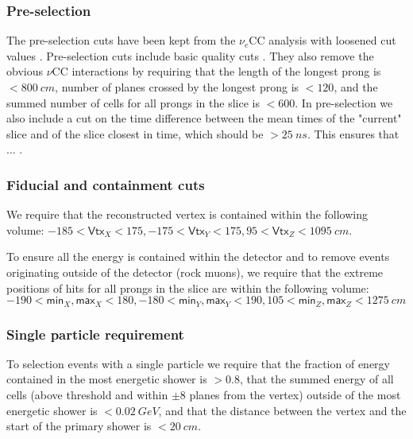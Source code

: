 \subsubsection*{Pre-selection}

The pre-selection cuts have been kept from the $\nu_e$CC analysis with loosened cut values .
Pre-selection cuts include basic quality cuts . They also remove the obvious $\nu$CC interactions by requiring that the length of the longest prong is $<800\ \unit{cm}$, number of planes crossed by the longest prong is $<120$, and the summed number of cells for all prongs in the slice is $<600$. In pre-selection we also include a cut on the time difference between the mean times of the "current" slice and of the slice closest in time, which should be $>25\ \unit{ns}$. This ensures that ... .


\subsubsection*{Fiducial and containment cuts}

We require that the reconstructed vertex is contained within the following volume: $-185<\textsf{Vtx}_X<175,-175<\textsf{Vtx}_Y<175, 95<\textsf{Vtx}_Z<1095\ \unit{cm}$.

To ensure all the energy is contained within the detector and to remove events originating outside of the detector (rock muons), we require that the extreme positions of hits for all prongs in the slice are within the following volume: $-190<\textsf{min}_X, \textsf{max}_X<180, -180<\textsf{min}_Y, \textsf{max}_Y<190, 105<\textsf{min}_Z, \textsf{max}_Z<1275\ \unit{cm}$

\subsubsection*{Single particle requirement}

To selection events with a single particle we require that the fraction of energy contained in the most energetic shower is $>0.8$, that the summed energy of all cells (above threshold and within $\pm8$ planes from the vertex) outside of the most energetic shower is $<0.02\ \unit{GeV}$, and that the distance between the vertex and the start of the primary shower is $<20\ \unit{cm}$.

